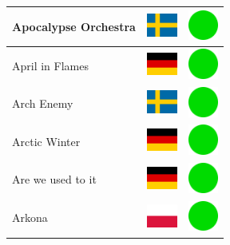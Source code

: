 \documentclass[12pt, a4paper, twoside]{report}
\begin{document}
\begin{center}
\begin{longtable}{|p{5cm}|p{2cm}|p{2cm}|}
Apocalypse Orchestra & \includegraphics[width=1cm]{4x3/se} & \includegraphics[width=1cm]{likes/y} \\ \hline
April in Flames & \includegraphics[width=1cm]{4x3/de} & \includegraphics[width=1cm]{likes/y} \\ \hline
Arch Enemy & \includegraphics[width=1cm]{4x3/se} & \includegraphics[width=1cm]{likes/y} \\ \hline
Arctic Winter & \includegraphics[width=1cm]{4x3/de} & \includegraphics[width=1cm]{likes/y} \\ \hline
Are we used to it & \includegraphics[width=1cm]{4x3/de} & \includegraphics[width=1cm]{likes/y} \\ \hline
Arkona & \includegraphics[width=1cm]{4x3/pl} & \includegraphics[width=1cm]{likes/y} \\ \hline

\end{longtable}
\end{center}
\end{document}
